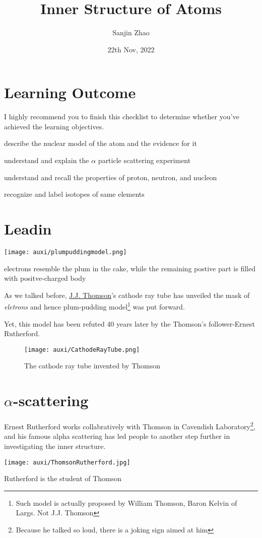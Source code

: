 \documentclass[a4paper]{tufte-handout}
\title{Inner Structure of Atoms}
\author{Sanjin Zhao}
\date{22th Nov, 2022}  %
\begin{document}
\maketitle%
\section*{Learning Outcome}
I highly recommend you to finish this checklist to determine whether you've achieved the learning objectives.
\begin{todolist}
  \item describe the nuclear model of the atom and the evidence for it
  \item understand and explain the $\alpha$ particle scattering experiment
  \item understand and recall the properties of proton, neutron, and nucleon
  \item recognize and label isotopes of same elements
\end{todolist}
\clearpage

\section{Leadin}
\begin{marginfigure}
\centering
\texttt{[image: auxi/plumpuddingmodel.png]}
\caption{electrons resemble the plum in the cake, while the remaining postive part is filled with positve-charged body}
\end{marginfigure}
As we talked before, \href{https://www.britannica.com/biography/J-J-Thomson}{J.J. Thomson}'s cathode ray tube has unveiled the mask of \emph{eletrons} and hence plum-pudding model\footnote{Such model is actually proposed by William Thomson, Baron Kelvin of Largs. Not J.J. Thomson} was put forward.

Yet, this model has been refuted 40 years later by the Thomson's follower-Ernest Rutherford.
\begin{figure}[h]
\centering
\texttt{[image: auxi/CathodeRayTube.png]}
\caption{The cathode ray tube invented by Thomson}
\end{figure}

\section{$\alpha$-scattering}
Ernest Rutherford works collabratively with Thomson in Cavendish Laboratory\footnote{Because he talked so loud, there is a joking sign aimed at him}, and his famous alpha scattering has led people to another step further in investigating the inner structure.
\begin{marginfigure}
\centering
\texttt{[image: auxi/ThomsonRutherford.jpg]}
\caption{Rutherford is the student of Thomson}
\end{marginfigure}
\end{document}
